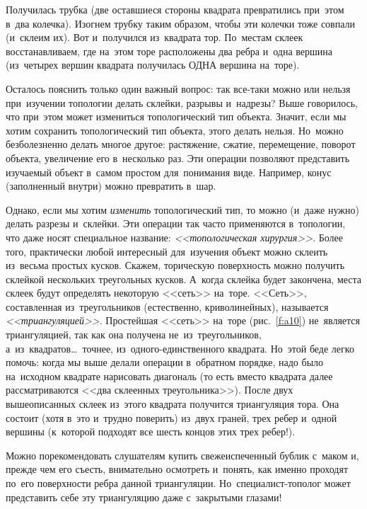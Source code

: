 
\pagebreak

Получилась трубка (две оставшиеся стороны квадрата превратились при~этом в~два колечка). Изогнем
трубку таким образом, чтобы эти колечки тоже совпали (и~склеим их). Вот и~получился из~квадрата
тор. По~местам склеек восстанавливаем, где на~этом торе расположены два ребра и~одна вершина
(из~четырех вершин квадрата получилась ОДНА вершина на~торе).

Осталось пояснить только один важный вопрос: так все-таки можно или нельзя при~изучении топологии
делать склейки, разрывы и~надрезы? Выше говорилось, что при~этом может измениться топологический
тип объекта. Значит, если мы хотим сохранить топологический тип объекта, этого делать нельзя.
Но~можно безболезненно делать многое другое: растяжение, сжатие, перемещение, поворот объекта,
увеличение его в~несколько раз. Эти операции позволяют представить изучаемый объект в~самом простом
для~понимания виде. Например, конус (заполненный внутри) можно превратить в~шар.

Однако, если мы хотим \textit{изменить} топологический тип, то можно (и~даже нужно) делать разрезы
и~склейки. Эти операции так часто применяются в~топологии, что даже носят специальное название:
\textit{<<топологическая хирургия>>}. Более того, практически любой интересный для~изучения объект можно
склеить из~весьма простых кусков. Скажем, торическую поверхность можно получить склейкой нескольких
треугольных кусков. А~когда склейка будет закончена, места склеек будут определять некоторую
<<сеть>> на~торе. <<Сеть>>, составленная из~треугольников (естественно, криволинейных), называется
\textit{<<триангуляцией>>}. Простейшая <<сеть>> на~торе (рис.~\ref{f:a10}) не~является триангуляцией, так как она
получена не~из~треугольников, а~из~квадратов\ldots\ точнее, из~одного-единственного квадрата. Но~этой
беде легко помочь: когда мы выше делали операции в~обратном порядке, надо было на~исходном квадрате
нарисовать диагональ (то есть вместо квадрата далее рассматриваются <<два склеенных треугольника>>).
После двух вышеописанных склеек из~этого квадрата получится триангуляция тора. Она состоит (хотя
в~это и~трудно поверить) из~двух граней, трех ребер и~одной вершины (к~которой подходят все шесть
концов этих трех ребер!).

Можно порекомендовать слушателям купить свежеиспеченный бублик с~маком и, прежде чем его съесть,
внимательно осмотреть и~понять, как именно проходят по~его поверхности ребра данной триангуляции.
Но~специалист-тополог может представить себе эту триангуляцию даже с~закрытыми глазами!

